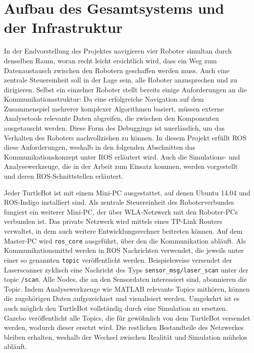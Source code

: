 \chapter{Aufbau des Gesamtsystems und der Infrastruktur}
In der Endvorstellung des Projektes navigieren vier Roboter simultan durch denselben Raum, woran recht leicht ersichtlich wird, dass ein Weg zum Datenaustausch zwischen den Robotern geschaffen werden muss. Auch eine zentrale Steuereinheit soll in der Lage sein, alle Roboter anzusprechen und zu dirigieren. Selbst ein einzelner Roboter stellt bereits einige Anforderungen an die Kommunikationsstruktur: Da eine erfolgreiche Navigation auf dem Zusammenspiel mehrerer komplexer Algorithmen basiert, müssen externe Analysetools relevante Daten abgreifen, die zwischen den Komponenten ausgetauscht werden. Diese Form des Debuggings ist unerlässlich, um das Verhalten des Roboters nachvollziehen zu können. In diesem Projekt erfüllt ROS diese Anforderungen, weshalb in den folgenden Abschnitten das Kommunikationskonzept unter ROS erläutert wird. Auch die Simulations- und Analysewerkzeuge, die in der Arbeit zum Einsatz kommen, werden vorgestellt und deren ROS-Schnittstellen erläutert.

Jeder TurtleBot ist mit einem Mini-PC ausgestattet, auf denen Ubuntu 14.04 und ROS-Indigo installiert sind. Als zentrale Steuereinheit des Roboterverbundes fungiert ein weiterer Mini-PC, der über WLA-Netzwerk mit den Roboter-PCs verbunden ist. Das private Netzwerk wird mittels eines TP-Link Routers verwaltet, in dem auch weitere Entwicklungsrechner beitreten können. Auf dem Master-PC wird \lstinline{ros_core}{} ausgeführt, über den die Kommunikation abläuft. Als Kommunikationsmittel werden in ROS Nachrichten verwendet, die jeweils unter einer so genannten \lstinline{topic}{} veröffentlicht werden. Beispielsweise versendet der Laserscanner zyklisch eine Nachricht des Typs \lstinline{sensor_msg/laser_scan}{} unter der topic \lstinline{/scan}{}. Alle Nodes, die an den Sensordaten interessiert sind, abonnieren die Topic. Indem Analysewerkzeuge wie MATLAB relevante Topics mithören, können die zugehörigen Daten aufgezeichnet und visualisiert werden. Umgekehrt ist es auch möglich den TurtleBot vollständig durch eine Simulation zu ersetzen. Gazebo veröffentlicht alle Topics, die für gewöhnlich von dem TurtleBot versendet werden, wodurch dieser ersetzt wird. Die restlichen Bestandteile des Netzwerkes bleiben erhalten, weshalb der Wechsel zwischen Realität und Simulation mühelos abläuft.

